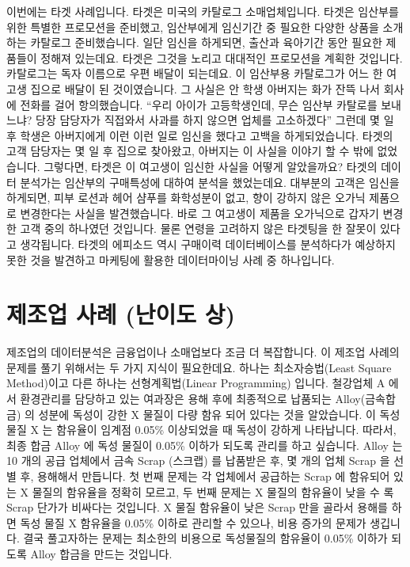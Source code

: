 \documentclass[letterpaper,10pt,english]{jupyterBook}
\begin{document}
\sphinxAtStartPar
이번에는 타겟 사례입니다. 타겟은 미국의 카탈로그 소매업체입니다. 타겟은 임산부를 위한 특별한 프로모션을 준비했고, 임산부에게 임신기간 중 필요한 다양한 상품을 소개하는 카탈로그 준비했습니다. 일단 임신을 하게되면, 출산과 육아기간 동안 필요한 제품들이 정해져 있는데요. 타겟은 그것을 노리고 대대적인 프로모션을 계획한 것입니다. 카탈로그는 독자 이름으로 우편 배달이 되는데요. 이 임산부용 카탈로그가 어느 한 여고생 집으로 배달이 된 것이였습니다. 그 사실은 안 학생 아버지는 화가 잔뜩 나서 회사에 전화를 걸어 항의했습니다. “우리 아이가 고등학생인데, 무슨 임산부 카탈로를 보내느냐? 당장 담당자가 직접와서 사과를 하지 않으면 업체를 고소하겠다”  그런데 몇 일 후 학생은 아버지에게 이런 이런 일로 임신을 했다고 고백을 하게되었습니다. 타겟의 고객 담당자는 몇 일 후 집으로 찾아왔고, 아버지는 이 사실을 이야기 할 수 밖에 없었습니다. 그렇다면, 타겟은 이 여고생이 임신한 사실을 어떻게 알았을까요?  타겟의 데이터 분석가는 임산부의 구매특성에 대하여 분석을 했었는데요. 대부분의 고객은 임신을 하게되면, 피부 로션과 헤어 샴푸를 화학성분이 없고, 향이 강하지 않은 오가닉 제품으로 변경한다는 사실을 발견했습니다. 바로 그 여고생이 제품을 오가닉으로 갑자기 변경한 고객 중의 하나였던 것입니다. 물론 연령을 고려하지 않은 타겟팅을 한 잘못이 있다고 생각됩니다. 타겟의 에피소드 역시 구매이력 데이터베이스를 분석하다가 예상하지 못한 것을 발견하고 마케팅에 활용한 데이터마이닝 사례 중 하나입니다.


\part{제조업 사례 (난이도 상)}
\label{\detokenize{chapter3/3.1.4_Use_Case:id1}}\label{\detokenize{chapter3/3.1.4_Use_Case::doc}}
\sphinxAtStartPar
제조업의 데이터분석은 금융업이나 소매업보다 조금 더 복잡합니다.  이 제조업 사례의 문제를 풀기 위해서는 두 가지 지식이 필요한데요. 하나는 최소자승법(Least Square Method)이고 다른 하나는 선형계획법(Linear Programming) 입니다.  철강업체 A 에서 환경관리를 담당하고 있는 여과장은 용해 후에 최종적으로 납품되는 Alloy(금속합금) 의 성분에 독성이 강한 X 물질이 다량 함유 되어 있다는 것을 알았습니다. 이 독성물질 X 는 함유율이 임계점 0.05\% 이상되었을 때 독성이 강하게 나타납니다. 따라서, 최종 합금 Alloy 에 독성 물질이 0.05\% 이하가 되도록 관리를 하고 싶습니다. Alloy 는 10 개의 공급 업체에서 금속 Scrap (스크랩) 를 납품받은 후, 몇 개의 업체 Scrap 을 선별 후, 용해해서 만듭니다. 첫 번째 문제는 각 업체에서 공급하는 Scrap 에 함유되어 있는 X 물질의 함유율을 정확히 모르고, 두 번째 문제는 X 물질의 함유율이 낮을 수 록 Scrap 단가가 비싸다는 것입니다. X 물질 함유율이 낮은 Scrap 만을 골라서 용해를 하면 독성 물질 X 함유율을 0.05\% 이하로 관리할 수 있으나, 비용 증가의 문제가 생깁니다. 결국 풀고자하는 문제는 최소한의 비용으로 독성물질의 함유율이 0.05\% 이하가 되도록 Alloy 합금을 만드는 것입니다.
\end{document}
